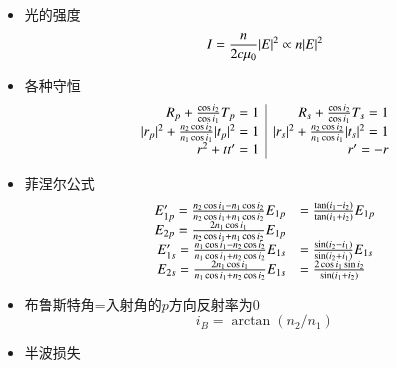 \documentclass[UTF8,8pt]{ctexart}
\begin{document}
\begin{multicols}{3}
\begin{itemize}
    \item 光的强度
    $$I=\frac{n}{2c\mu_0}|E|^2 \propto n|E|^2$$
    \item 各种守恒
    $$\begin{array}{r|r}
        R_p+\frac{\cos i_2}{\cos i_1}T_p=1&R_s+\frac{\cos i_2}{\cos i_1}T_s=1\\
        |r_p|^2+\frac{n_2\cos i_2}{n_1\cos i_1}|t_p|^2=1&|r_s|^2+\frac{n_2\cos i_2}{n_1\cos i_1}|t_s|^2=1\\
        r^2+tt'=1&r'=-r
    \end{array}$$
    \item 菲涅尔公式
    $$\begin{array}{rl} 
        E'_{1p}=\frac{n_2\cos i_1-n_1\cos i_2}{n_2\cos i_1+n_1\cos i_2}E_{1p}&=\frac{\tan(i_1-i_2)}{\tan(i_1+i_2)}E_{1p}\\
        E_{2p}=\frac{2n_1\cos i_1}{n_2\cos i_1+n_1\cos i_2}E_{1p}\\
        E'_{1s}=\frac{n_1\cos i_1-n_2\cos i_2}{n_1\cos i_1+n_2\cos i_2}E_{1s}&=\frac{\sin(i_2-i_1)}{\sin(i_2+i_1)}E_{1s}\\
        E_{2s}=\frac{2n_1\cos i_1}{n_1\cos i_1+n_2\cos i_2}E_{1s}&=\frac{2\cos i_1\sin i_2}{\sin(i_1+i_2)}
     \end{array}$$
    \item 布鲁斯特角=入射角的$p$方向反射率为0
    $$i_B=\arctan(n_2/n_1)$$
    \item 半波损失
    

\end{itemize}
\end{multicols}
\end{document}
